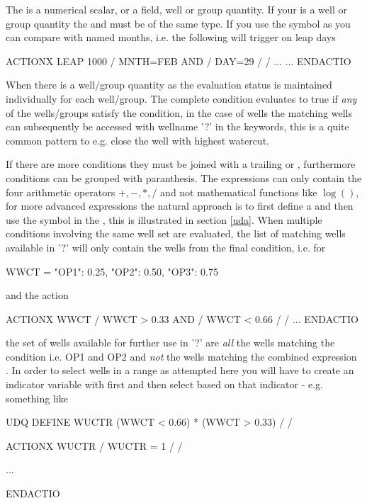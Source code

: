 The  is a numerical scalar, or a field, well or group quantity.
If your  is a well or group quantity the  and
 must be of the same type. If you use the symbol  as
 you can compare with named months, i.e. the following will
trigger on leap days
\begin{deck}
ACTIONX
  LEAP 1000 /
  MNTH=FEB AND /
  DAY=29 /
/
...
...
ENDACTIO
\end{deck}
When there is a well/group quantity as  the evaluation status is
maintained individually for each well/group. The complete condition evaluates to
true if \emph{any} of the wells/groups satisfy the condition, in the case of
wells the matching wells can subsequently be accessed with wellname '?' in the
 keywords, this is a quite common pattern to e.g. close the well
with highest watercut.

If there are more conditions they must be joined with a trailing  or
, furthermore conditions can be grouped with paranthesis. The \actionx{}
expressions can only contain the four arithmetic operators $+,-,*,/$ and not
mathematical functions like $\log()$, for more advanced expressions the natural
approach is to first define a \udq{} and then use the \udq{} symbol in the
\actionx{}, this is illustrated in section \ref{uda}. When multiple conditions
involving the same well set are evaluated, the list of matching wells available
in '?' will only contain the wells from the final condition, i.e. for
\begin{code}
 WWCT = {"OP1": 0.25, "OP2": 0.50, "OP3": 0.75}
\end{code}
and the action
\begin{deck}
ACTIONX
  WWCT /
  WWCT > 0.33 AND /
  WWCT < 0.66 /
/
...
ENDACTIO
\end{deck}
the set of wells available for further use in '?' are \emph{all} the wells
matching the condition  i.e. OP1 and OP2 and \emph{not}
the wells matching the combined expression . In
order to select wells in a range as attempted here you will have to create an
indicator variable with \udq{} first and then select based on that indicator -
e.g. something like
\begin{deck}
UDQ
  DEFINE WUCTR (WWCT < 0.66) * (WWCT > 0.33) /
/

ACTIONX
  WUCTR /
  WUCTR = 1 /
/

...

ENDACTIO
\end{deck}

